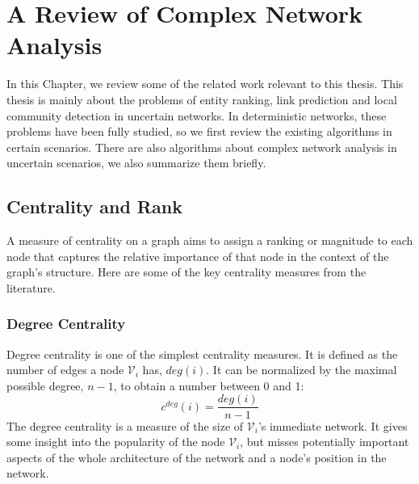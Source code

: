 \documentclass[\main/thesis.tex]{subfiles}
\begin{document}
\chapter{A Review of Complex Network Analysis}
In this Chapter, we review some of the related work relevant to this thesis. This thesis is mainly about the problems of entity ranking, link prediction and local community detection in uncertain networks. In deterministic networks, these problems have been fully studied, so we first review the existing algorithms in certain scenarios. There are also algorithms about complex network analysis in uncertain scenarios, we also summarize them briefly.

\section{Centrality and Rank}
A measure of centrality on a graph aims to assign a ranking or magnitude to each node that captures the relative importance of that node in the context of the graph’s structure. Here are some of the key centrality measures from the literature.
\subsection{Degree Centrality}
Degree centrality is one of the simplest centrality measures. It is defined as the number of edges a node $\mathcal{V}_i$ has, $deg(i)$. It can be normalized by the maximal possible degree, $n-1$, to obtain a number between 0 and 1:
\begin{equation}
c^{deg}(i) = \frac{deg(i)}{n-1}
\end{equation}
The degree centrality is a measure of the size of $\mathcal{V}_i$'s immediate network. It gives some insight into the popularity of the node $\mathcal{V}_i$, but misses potentially important aspects of the whole architecture of the network and a node’s position in the network.
\end{document}
